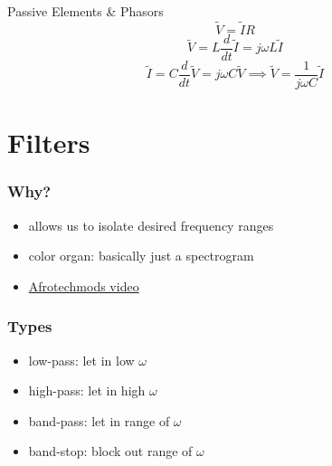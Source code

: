 \documentclass[aspectratio=169]{beamer}
\begin{document}
\begin{frame}{Passive Elements \& Phasors}
    \begin{equation}
        \widetilde{V} = \widetilde{I} R
    \end{equation}
    \begin{equation}
        \widetilde{V} = L \frac{d}{dt} \widetilde{I} = j \omega L \widetilde{I}
    \end{equation}
    \begin{equation}
        \widetilde{I} = C \frac{d}{dt} \widetilde{V} = j \omega C \widetilde{V} \implies \widetilde{V} = \frac{1}{j \omega C} \widetilde{I}
    \end{equation}
\end{frame}

\section{Filters}

\begin{frame}
    \frametitle{Why?}

    \begin{itemize}
        \item allows us to isolate desired frequency ranges
        \item color organ: basically just a spectrogram
        \item \href{https://youtu.be/OBM5T5_kgdI}{Afrotechmods video}
    \end{itemize}
\end{frame}

\begin{frame}
    \frametitle{Types}

    \begin{itemize}
        \item low-pass: let in low \(\omega\)
        \item high-pass: let in high \(\omega\)
        \item band-pass: let in range of \(\omega\)
        \item band-stop: block out range of \(\omega\)
    \end{itemize}
\end{frame}
\end{document}
